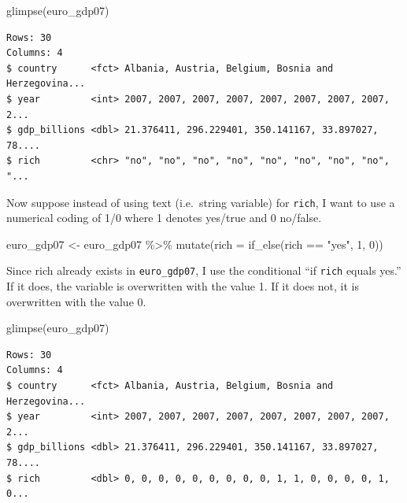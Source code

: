 \documentclass[
]{book}
\makeatletter
\newenvironment{Shaded}{\begin{snugshade}}{\end{snugshade}}
\newcommand{\AttributeTok}[1]{\textcolor[rgb]{0.61,0.61,0.61}{#1}}
\newcommand{\DecValTok}[1]{\textcolor[rgb]{0.06,0.06,0.06}{#1}}
\newcommand{\FunctionTok}[1]{\textcolor[rgb]{0,0,0}{#1}}
\newcommand{\NormalTok}[1]{#1}
\newcommand{\OtherTok}[1]{\textcolor[rgb]{0.37,0.37,0.37}{#1}}
\newcommand{\SpecialCharTok}[1]{\textcolor[rgb]{0,0,0}{#1}}
\newcommand{\StringTok}[1]{\textcolor[rgb]{0.5,0.5,0.5}{#1}}
\newenvironment{kframe}{%
\medskip{}
\setlength{\fboxsep}{.8em}
 \def\at@end@of@kframe{}%
 \ifinner\ifhmode%
  \def\at@end@of@kframe{\end{minipage}}%
  \begin{minipage}{\columnwidth}%
 \fi\fi%
 \def\FrameCommand##1{\hskip\@totalleftmargin \hskip-\fboxsep
 \colorbox{shadecolor}{##1}\hskip-\fboxsep
     \hskip-\linewidth \hskip-\@totalleftmargin \hskip\columnwidth}%
 \MakeFramed {\advance\hsize-\width
   \@totalleftmargin\z@ \linewidth\hsize
   \@setminipage}}%
 {\par\unskip\endMakeFramed%
 \at@end@of@kframe}
\renewenvironment{Shaded}{\begin{kframe}}{\end{kframe}}
\makeatother
\begin{document}
\begin{Shaded}
\begin{Highlighting}[]
\FunctionTok{glimpse}\NormalTok{(euro\_gdp07)}
\end{Highlighting}
\end{Shaded}

\begin{verbatim}
Rows: 30
Columns: 4
$ country      <fct> Albania, Austria, Belgium, Bosnia and Herzegovina...
$ year         <int> 2007, 2007, 2007, 2007, 2007, 2007, 2007, 2007, 2...
$ gdp_billions <dbl> 21.376411, 296.229401, 350.141167, 33.897027, 78....
$ rich         <chr> "no", "no", "no", "no", "no", "no", "no", "no", "...
\end{verbatim}

Now suppose instead of using text (i.e.~string variable) for \texttt{rich}, I want to use a numerical coding of 1/0 where 1 denotes yes/true and 0 no/false.

\begin{Shaded}
\begin{Highlighting}[]
\NormalTok{euro\_gdp07 }\OtherTok{\textless{}{-}}\NormalTok{ euro\_gdp07 }\SpecialCharTok{\%\textgreater{}\%} 
  \FunctionTok{mutate}\NormalTok{(}\AttributeTok{rich =} \FunctionTok{if\_else}\NormalTok{(rich }\SpecialCharTok{==} \StringTok{"yes"}\NormalTok{, }\DecValTok{1}\NormalTok{, }\DecValTok{0}\NormalTok{))}
\end{Highlighting}
\end{Shaded}

Since rich already exists in \texttt{euro\_gdp07}, I use the conditional ``if \texttt{rich} equals yes.'' If it does, the variable is overwritten with the value 1. If it does not, it is overwritten with the value 0.

\begin{Shaded}
\begin{Highlighting}[]
\FunctionTok{glimpse}\NormalTok{(euro\_gdp07)}
\end{Highlighting}
\end{Shaded}

\begin{verbatim}
Rows: 30
Columns: 4
$ country      <fct> Albania, Austria, Belgium, Bosnia and Herzegovina...
$ year         <int> 2007, 2007, 2007, 2007, 2007, 2007, 2007, 2007, 2...
$ gdp_billions <dbl> 21.376411, 296.229401, 350.141167, 33.897027, 78....
$ rich         <dbl> 0, 0, 0, 0, 0, 0, 0, 0, 0, 1, 1, 0, 0, 0, 0, 1, 0...
\end{verbatim}
\end{document}
